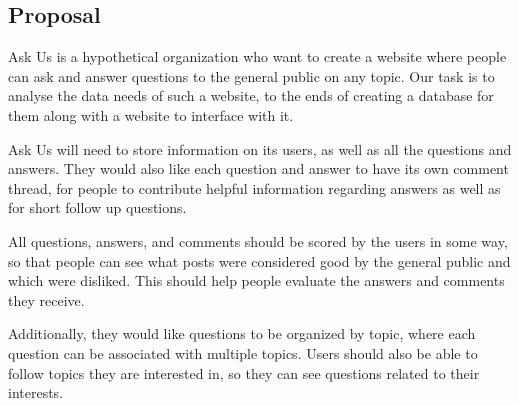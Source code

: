 \subsection{Proposal}

Ask Us is a hypothetical organization who want to create a website where people can ask and answer questions to the general public on any topic. Our task is to analyse the data needs of such a website, to the ends of creating a database for them along with a website to interface with it.

Ask Us will need to store information on its users, as well as all the questions and answers. They would also like each question and answer to have its own comment thread, for people to contribute helpful information regarding answers as well as for short follow up questions.

All questions, answers, and comments should be scored by the users in some way, so that people can see what posts were considered good by the general public and which were disliked. This should help people evaluate the answers and comments they receive.

Additionally, they would like questions to be organized by topic, where each question can be associated with multiple topics. Users should also be able to follow topics they are interested in, so they can see questions related to their interests.